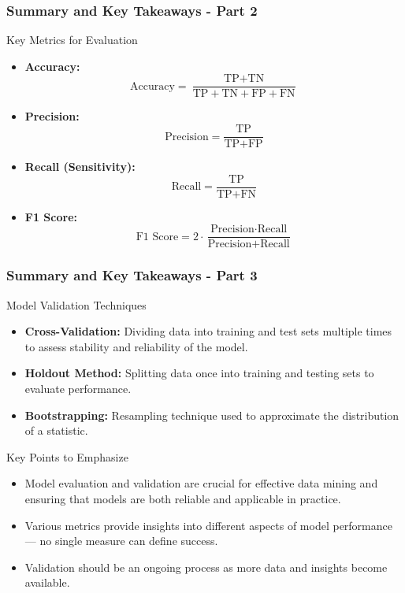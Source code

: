 \documentclass[aspectratio=169]{beamer}
\begin{document}
\begin{frame}[fragile]
    \frametitle{Summary and Key Takeaways - Part 2}
    \begin{block}{Key Metrics for Evaluation}
        \begin{itemize}
            \item \textbf{Accuracy:} 
            \[
            \text{Accuracy} = \frac{\text{TP} + \text{TN}}{\text{TP} + \text{TN} + \text{FP} + \text{FN}}
            \]
            \item \textbf{Precision:} 
            \[
            \text{Precision} = \frac{\text{TP}}{\text{TP} + \text{FP}}
            \]
            \item \textbf{Recall (Sensitivity):} 
            \[
            \text{Recall} = \frac{\text{TP}}{\text{TP} + \text{FN}}
            \]
            \item \textbf{F1 Score:} 
            \[
            \text{F1 Score} = 2 \cdot \frac{\text{Precision} \cdot \text{Recall}}{\text{Precision} + \text{Recall}}
            \]
        \end{itemize}
    \end{block}
\end{frame}

\begin{frame}[fragile]
    \frametitle{Summary and Key Takeaways - Part 3}
    \begin{block}{Model Validation Techniques}
        \begin{itemize}
            \item \textbf{Cross-Validation:} Dividing data into training and test sets multiple times to assess stability and reliability of the model.
            \item \textbf{Holdout Method:} Splitting data once into training and testing sets to evaluate performance.
            \item \textbf{Bootstrapping:} Resampling technique used to approximate the distribution of a statistic.
        \end{itemize}
    \end{block}

    \begin{block}{Key Points to Emphasize}
        \begin{itemize}
            \item Model evaluation and validation are crucial for effective data mining and ensuring that models are both reliable and applicable in practice.
            \item Various metrics provide insights into different aspects of model performance — no single measure can define success.
            \item Validation should be an ongoing process as more data and insights become available.
        \end{itemize}
    \end{block}
\end{frame}
\end{document}
